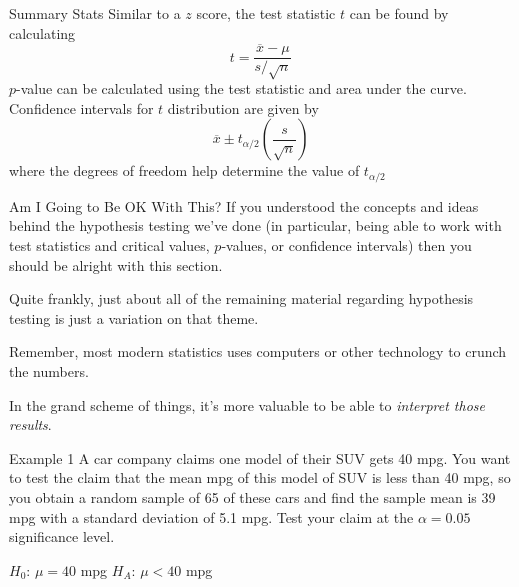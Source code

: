 \documentclass[t]{beamer}
\begin{document}
\begin{frame}{Summary Stats}
Similar to a $z$ score, the test statistic $t$ can be found by calculating
\[t = \frac{\overline{x}-\mu}{s/\sqrt{n}}\]
\pause
$p$-value can be calculated using the test statistic and area under the curve. \newline\\	\pause
Confidence intervals for $t$ distribution are given by
\[\overline{x} \pm t_{\alpha/2}\left(\frac{s}{\sqrt{n}}\right)\]
where the degrees of freedom help determine the value of $t_{\alpha/2}$
\end{frame}

\begin{frame}{Am I Going to Be OK With This?}
If you understood the concepts and ideas behind the hypothesis testing we've done (in particular, being able to work with test statistics and critical values, $p$-values, or confidence intervals) then you should be alright with this section.	\newline\\	\pause

Quite frankly, just about all of the remaining material regarding hypothesis testing is just a variation on that theme.		\newline\\	\pause

Remember, most modern statistics uses computers or other technology to crunch the numbers. \newline\\	\pause

In the grand scheme of things, it's more valuable to be able to \emph{interpret those results}.
\end{frame}

\begin{frame}{Example 1}
A car company claims one model of their SUV gets 40 mpg. You want to test the claim that the mean mpg of this model of SUV is less than 40 mpg, so you obtain a random sample of 65 of these cars and find the sample mean is 39 mpg with a standard deviation of 5.1 mpg. Test your claim at the $\alpha = 0.05$ significance level.	\newline\\	\pause

$H_0: \, \mu = 40$ mpg	\newline
$H_A: \, \mu < 40$ mpg
\end{frame}
\end{document}
